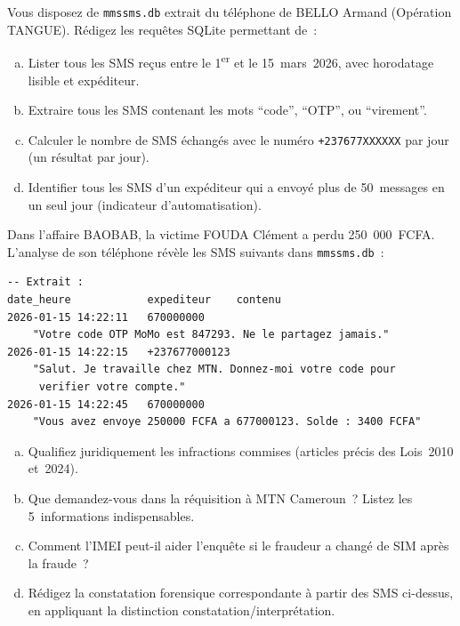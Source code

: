 \bigskip

\begin{boxexo}[title={\ding{45}\quad Exercice~16.1 --- Requêtes SQLite \niveaubase}]
Vous disposez de \texttt{mmssms.db} extrait du téléphone de BELLO Armand
(Opération TANGUE). Rédigez les requêtes SQLite permettant de~:
\begin{enumerate}[(a)]
    \item Lister tous les SMS reçus entre le 1\textsuperscript{er} et
          le 15~mars~2026, avec horodatage lisible et expéditeur.
    \item Extraire tous les SMS contenant les mots ``code'', ``OTP'',
          ou ``virement''.
    \item Calculer le nombre de SMS échangés avec le numéro
          \texttt{+237677XXXXXX} par jour (un résultat par jour).
    \item Identifier tous les SMS d'un expéditeur qui a envoyé
          plus de 50~messages en un seul jour (indicateur d'automatisation).
\end{enumerate}
\end{boxexo}

\begin{boxexo}[title={\ding{45}\quad Exercice~16.2 --- Fraude MoMo \niveaumoyen}]
Dans l'affaire BAOBAB, la victime FOUDA Clément a perdu 250~000~FCFA.
L'analyse de son téléphone révèle les SMS suivants dans \texttt{mmssms.db}~:
\begin{lstlisting}[language=bash_forensique]
-- Extrait :
date_heure            expediteur    contenu
2026-01-15 14:22:11   670000000
    "Votre code OTP MoMo est 847293. Ne le partagez jamais."
2026-01-15 14:22:15   +237677000123
    "Salut. Je travaille chez MTN. Donnez-moi votre code pour
     verifier votre compte."
2026-01-15 14:22:45   670000000
    "Vous avez envoye 250000 FCFA a 677000123. Solde : 3400 FCFA"
\end{lstlisting}
\begin{enumerate}[(a)]
    \item Qualifiez juridiquement les infractions commises (articles
          précis des Lois~2010 et~2024).
    \item Que demandez-vous dans la réquisition à MTN Cameroun~?
          Listez les 5~informations indispensables.
    \item Comment l'IMEI peut-il aider l'enquête si le fraudeur
          a changé de SIM après la fraude~?
    \item Rédigez la constatation forensique correspondante à partir
          des SMS ci-dessus, en appliquant la distinction
          constatation/interprétation.
\end{enumerate}
\end{boxexo}

